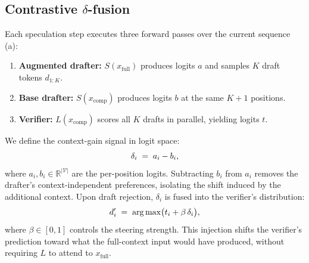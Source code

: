 \documentclass[11pt]{article}
\theoremstyle{plain}
\theoremstyle{definition}
\begin{document}
\subsection{Contrastive $\delta$-fusion}
\label{sec:method-delta}
Each speculation step executes three forward passes over the current sequence (a):
\begin{enumerate}\itemsep0pt
    \item \textbf{Augmented drafter:} $S(x_{\text{full}})$ produces logits $a$ and samples $K$ draft tokens $d_{1:K}$.
    \item \textbf{Base drafter:} $S(x_{\text{comp}})$ produces logits $b$ at the same $K+1$ positions.
    \item \textbf{Verifier:} $L(x_{\text{comp}})$ scores all $K$ drafts in parallel, yielding logits $t$.
\end{enumerate}
We define the context-gain signal in logit space:
\vspace{-0.8em}
\begin{equation}
\delta_i \;=\; a_i - b_i,
\label{eq:delta}
\vspace{-0.5em}
\end{equation}
where $a_i, b_i \in \mathbb{R}^{|\mathcal{V}|}$ are the per-position logits. Subtracting $b_i$ from $a_i$ removes the drafter's context-independent preferences, isolating the shift induced by the additional context. Upon draft rejection, $\delta_i$ is fused into the verifier's distribution:
\vspace{-0.8em}
\begin{equation}
d'_i \;=\; \arg\max\bigl(t_i + \beta\,\delta_i\bigr),
\label{eq:fusion}
\vspace{-0.5em}
\end{equation}
where $\beta\in[0,1]$ controls the steering strength. This injection shifts the verifier's prediction toward what the full-context input would have produced, without requiring $L$ to attend to $x_{\text{full}}$.
\end{document}
